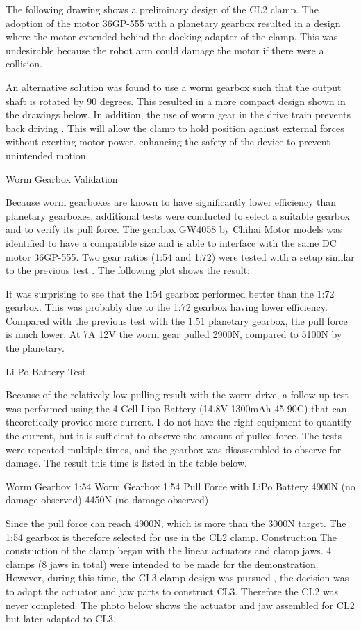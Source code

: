 The following drawing shows a preliminary design of the CL2 clamp. The adoption of the motor 36GP-555 with a planetary gearbox resulted in a design where the motor extended behind the docking adapter of the clamp. This was undesirable because the robot arm could damage the motor if there were a collision. 

An alternative solution was found to use a worm gearbox such that the output shaft is rotated by 90 degrees. This resulted in a more compact design shown in the drawings below. In addition, the use of worm gear in the drive train prevents back driving . This will allow the clamp to hold position against external forces without exerting motor power, enhancing the safety of the device to prevent unintended motion.

Worm Gearbox Validation

Because worm gearboxes are known to have significantly lower efficiency than planetary gearboxes, additional tests were conducted to select a suitable gearbox and to verify its pull force. The gearbox GW4058 by Chihai Motor models was identified to have a compatible size and is able to interface with the same DC motor 36GP-555. Two gear ratios (1:54 and 1:72) were tested with a setup similar to the previous test . The following plot shows the result:

It was surprising to see that the 1:54 gearbox performed better than the 1:72 gearbox. This was probably due to the 1:72 gearbox having lower efficiency. Compared with the previous test with the 1:51 planetary gearbox, the pull force is much lower. At 7A 12V the worm gear pulled 2900N, compared to 5100N by the planetary.

Li-Po Battery Test

Because of the relatively low pulling result with the worm drive, a follow-up test was performed using the 4-Cell Lipo Battery (14.8V 1300mAh 45-90C) that can theoretically provide more current. I do not have the right equipment to quantify the current, but it is sufficient to observe the amount of pulled force. The tests were repeated multiple times, and the gearbox was disassembled to observe for damage. The result this time is listed in the table below. 


Worm Gearbox 1:54 
Worm Gearbox 1:54 
Pull Force with LiPo Battery
4900N (no damage observed)
4450N (no damage observed)

Since the pull force can reach 4900N, which is more than the 3000N target. The 1:54 gearbox is therefore selected for use in the CL2 clamp.
Construction 
The construction of the clamp began with the linear actuators and clamp jaws. 4 clamps (8 jaws in total) were intended to be made for the demonstration. However, during this time, the CL3 clamp design was pursued , the decision was to adapt the actuator and jaw parts to construct CL3. Therefore the CL2 was never completed. The photo below shows the actuator and jaw assembled for CL2 but later adapted to CL3.


